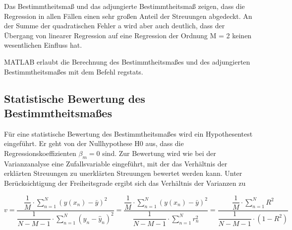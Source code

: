 \begin{table}[H]
{\begin{tabular}{| c | c | c | c | c | c |}
\parbox[c][0.3in][c]{0.95in}{} &
\parbox[c][0.3in][c]{0.95in}{} &
\parbox[c][0.3in][c]{0.95in}{} &
\parbox[c][0.3in][c]{0.95in}{} &
\parbox[c][0.3in][c]{0.95in}{} &
\parbox[c][0.3in][c]{0.95in}{}\\ \hline

\end{tabular}%
}
\label{tab:twelvethirteen}
\end{table}

\noindent Das Bestimmtheitsma{\ss} und das adjungierte Bestimmtheitsma{\ss} zeigen, dass die Regression in allen F\"{a}llen einen sehr gro{\ss}en Anteil der Streuungen abgedeckt. An der Summe der quadratischen Fehler a wird aber auch deutlich, dass der \"{U}bergang von linearer Regression auf eine Regression der Ordnung M = 2 keinen wesentlichen Einfluss hat. 

\clearpage

\noindent MATLAB erlaubt die Berechnung des Bestimmtheitsma{\ss}es und des adjungierten Bestimmtheitsma{\ss}es mit dem Befehl regstats.



\subsection{Statistische Bewertung des Bestimmtheitsma{\ss}es}

\noindent F\"{u}r eine statistische Bewertung des Bestimmtheitsma{\ss}es wird ein Hypothesentest eingef\"{u}hrt. Er geht von der Nullhypothese H0 aus, dass die Regressionskoeffizienten $\beta_{m} = 0$ sind. Zur Bewertung wird wie bei der Varianzanalyse eine Zufallsvariable eingef\"{u}hrt, mit der das Verh\"{a}ltnis der erkl\"{a}rten Streuungen zu unerkl\"{a}rten Streuungen bewertet werden kann. Unter Ber\"{u}cksichtigung der Freiheitsgrade ergibt sich das Verh\"{a}ltnis der Varianzen zu

\begin{equation}\label{eq:twelveonehundredtwentyone}
v=\dfrac{\dfrac{1}{M} \cdot \displaystyle\sum\limits _{n=1}^{N}\left(y(x_{n})-\bar{y}\right)^{2}}{\dfrac{1}{N-M-1} \cdot \displaystyle\sum\limits _{n=1}^{N}\left(y_{n} -\hat{y}_{n} \right)^{2}} =\dfrac{\dfrac{1}{M} \cdot \displaystyle\sum\limits _{n=1}^{N}\left(y(x_{n})-\bar{y}\right)^{2}  }{\dfrac{1}{N-M-1} \cdot \displaystyle\sum\limits _{n=1}^{N}r_{n}^{2}} =\dfrac{\dfrac{1}{M} \cdot \displaystyle\sum\limits _{n=1}^{N}R^{2}  }{\dfrac{1}{N-M-1} \cdot \left(1-R^{2} \right)}
\end{equation}

